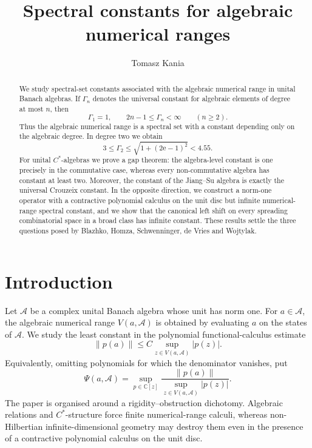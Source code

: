 \documentclass[a4paper]{amsart}
\title[Spectral constants for numerical ranges]{Spectral constants for algebraic numerical ranges}
\author[T.~Kania]{Tomasz Kania}
\date{}
\theoremstyle{remark}
\newcommand{\C}{\mathbb C}
\newcommand{\calA}{\mathcal A}
\begin{document}
\begin{abstract}
We study spectral-set constants associated with the algebraic numerical range
in unital Banach algebras.  If \(\Gamma_n\) denotes the universal constant
for algebraic elements of degree at most \(n\), then
\[
        \Gamma_1=1,
        \qquad
        2n-1\leqslant\Gamma_n<\infty\qquad(n\geqslant2).
\]
Thus the algebraic numerical range is a spectral set with a constant depending
only on the algebraic degree.  In degree two we obtain
\[
        3\leqslant\Gamma_2
        \leqslant\sqrt{1+(2\mathrm e-1)^2}<4.55.
\]
For unital \(C^*\)-algebras we prove a gap theorem: the algebra-level constant
is one precisely in the commutative case, whereas every non-commutative
algebra has constant at least two.  Moreover, the constant of the Jiang--Su
algebra is exactly the universal Crouzeix constant.  In the opposite
direction, we construct a norm-one operator with a contractive polynomial
calculus on the unit disc but infinite numerical-range spectral constant, and
we show that the canonical left shift on every spreading combinatorial space
in a broad class has infinite constant.  These results settle the three
questions posed by Blazhko, Homza, Schwenninger, de Vries and Wojtylak.
\end{abstract}

\maketitle

\section{Introduction}

Let \(\calA\) be a complex unital Banach algebra whose unit has norm one.
For \(a\in\calA\), the algebraic numerical range \(V(a,\calA)\) is obtained by
evaluating \(a\) on the states of \(\calA\).  We study the least constant in
the polynomial functional-calculus estimate
\[
        \|p(a)\|\leqslant C
        \sup_{z\in V(a,\calA)}|p(z)|.
\]
Equivalently, omitting polynomials for which the denominator vanishes, put
\[
        \Psi(a,\calA)=
        \sup_{p\in\C[z]}
        \frac{\|p(a)\|}{\sup_{z\in V(a,\calA)}|p(z)|}.
\]
The paper is organised around a rigidity--obstruction dichotomy.  Algebraic
relations and \(C^*\)-structure force finite numerical-range calculi, whereas
non-Hilbertian infinite-dimensional geometry may destroy them even in the
presence of a contractive polynomial calculus on the unit disc.
\end{document}
